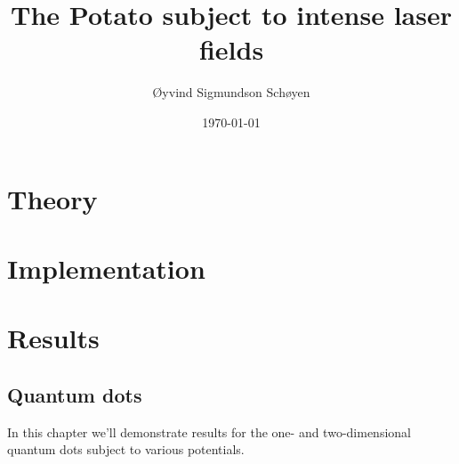\documentclass[twoside, english, notitlepage, 12pt]{uiofysmaster}
\author{Øyvind Sigmundson Schøyen}
\title{The Potato subject to intense laser fields}
\date{\today}
\begin{document}
\frontmatter
    \maketitle

    \begin{abstract}
        
    \end{abstract}

    \begin{acknowledgements}
        
    \end{acknowledgements}

    \tableofcontents
    \listoffigures
    \listoftables

\mainmatter

    

    \part{Theory}
        
        

        
        
        

    \part{Implementation}
        

        

        

    \part{Results}
        
        \chapter{Quantum dots}
            In this chapter we'll demonstrate results for the one- and
            two-dimensional quantum dots subject to various potentials.
\end{document}
